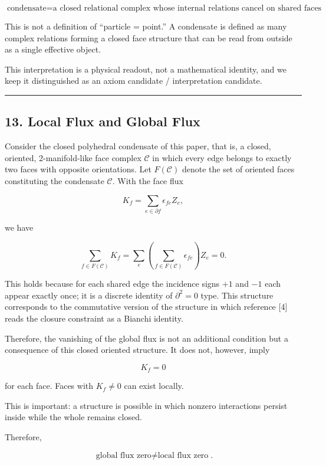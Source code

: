 \documentclass[
  a4paper,
]{article}
\begin{document}
\[
\boxed{\text{condensate}=\text{a closed relational complex whose internal relations cancel on shared faces}}.
\]

This is not a definition of ``particle = point.'' A condensate is
defined as many complex relations forming a closed face structure that
can be read from outside as a single effective object.

This interpretation is a physical readout, not a mathematical identity,
and we keep it distinguished as an axiom candidate / interpretation
candidate.

\begin{center}\rule{0.5\linewidth}{0.5pt}\end{center}

\subsection{13. Local Flux and Global
Flux}\label{local-flux-and-global-flux}

Consider the closed polyhedral condensate of this paper, that is, a
closed, oriented, 2-manifold-like face complex \(\mathcal C\) in which
every edge belongs to exactly two faces with opposite orientations. Let
\(F(\mathcal C)\) denote the set of oriented faces constituting the
condensate \(\mathcal C\). With the face flux

\[
K_f=\sum_{e\in\partial f}\epsilon_{fe}Z_e,
\]

we have

\[
\sum_{f\in F(\mathcal C)}K_f=\sum_{e}\left(\sum_{f\in F(\mathcal C)}\epsilon_{fe}\right)Z_e=0.
\]

This holds because for each shared edge the incidence signs \(+1\) and
\(-1\) each appear exactly once; it is a discrete identity of
\(\partial^2=0\) type. This structure corresponds to the commutative
version of the structure in which reference {[}4{]} reads the closure
constraint as a Bianchi identity.

Therefore, the vanishing of the global flux is not an additional
condition but a consequence of this closed oriented structure. It does
not, however, imply

\[
K_f=0
\]

for each face. Faces with \(K_f\neq0\) can exist locally.

This is important: a structure is possible in which nonzero interactions
persist inside while the whole remains closed.

Therefore,

\[
\boxed{\text{global flux zero}\neq\text{local flux zero}}.
\]
\end{document}
